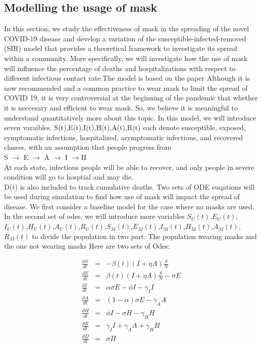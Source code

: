 \documentclass{article}
\begin{document}
\subsection{Modelling the usage of mask}
In this section, we study the effectiveness of mask in the spreading of the novel COVID-19 disease and develop a variation of the susceptible-infected-removed (SIR) model that provides a theoretical framework to investigate its spread within a community. More specifically, we will investigate how the use of mask will influence the percentage of deaths and hospitalizations with respect to different infectious contact rate.The model is based on the paper \cite{Steff2020mask} Although it is now recommended and a common practice to wear mask to limit the spread of COVID 19, it is very controversial at the beginning of the pandemic that whether it is neccesary and efficient to wear mask. So, we believe it is meaningful to understand quantitatively more about this topic.
In this model, we will introduce seven varaibles. S(t),E(t),I(t),H(t),A(t),R(t) each denote susceptible, exposed, symptomatic infectious, hospitalized, asymptomatic infectious, and recovered classes, with an assumption that people progress from \\
S $\rightarrow$ E $\rightarrow$ A $\rightarrow$ I $\rightarrow$H \\ At each state, infectious people will be able to recover, and only people in severe condition will go to hosptial and may die.\\D(t) is also included to track cumulative deaths. Two sets of ODE euqations will be used during simulation to find how use of mask will impact the spread of disease. We first consider a baseline model for the case where no masks are used. In the second set of odes, we will introduce more variables
$S_{U}(t)$,$E_{U}(t)$,$I_{U}(t)$,$H_{U}(t)$,$A_{U}(t)$,$R_{U}(t)$,$S_{M}(t)$,$E_{M}(t)$,$I_{M}(t)$,$H_{M}(t)$,$A_{M}(t)$,$R_{M}(t)$ to divide the population in two part: The population wearing masks and the one not wearing masks
Here are two sets of Odes:\\
\begin{minipage}{0.45\textwidth}
\begin{eqnarray}
  \frac{dS}{dt} &=& -\beta{(t)}(I+\eta A)\frac{S}{N}\nonumber\\
  \frac{dE}{dt} &=& \beta(t)(I+\eta A)\frac{S}{N}-\sigma{E}\nonumber\\
  \frac{dI}{dt} &=& \alpha\sigma{E}-\phi{I}-\gamma_{I}I\nonumber\\
  \frac{dA}{dt} &=& (1-\alpha)\sigma E-\gamma_{A}A\nonumber\\
  \frac{dH}{dt} &=& \phi I - \sigma H - \gamma_{H}H\nonumber\\
  \frac{dR}{dt} &=& \gamma_{I}{I} + \gamma_{A}{A}+\gamma_{H}{H}\nonumber\\
  \frac{dD}{dt} &=& \sigma H\nonumber\\
\end{eqnarray}
\end{minipage}
\end{document}
